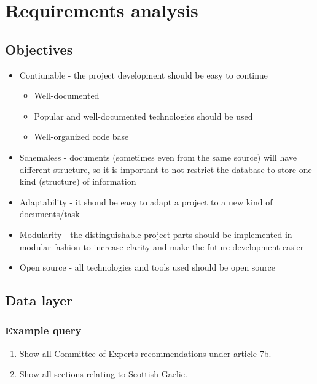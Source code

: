 \documentclass[11pt, a4paper]{report}
\begin{document}









\chapter{Requirements analysis}

\section{Objectives}
\begin{itemize}
  \item Contiunable - the project development should be easy to continue
    \begin{itemize}
      \item Well-documented
      \item Popular and well-documented technologies should be used
      \item Well-organized code base
    \end{itemize}
  \item Schemaless - documents (sometimes even from the same source) will have different structure, so it is important to not restrict the database to store one kind (structure) of information
  \item Adaptability - it shoud be easy to adapt a project to a new kind of documents/task
  \item Modularity - the distinguishable project parts should be implemented in modular fashion to increase clarity and make the future development easier
  \item Open source - all technologies and tools used should be open source
\end{itemize}

\section{Data layer}
\subsection{Example query}
\begin{enumerate}
  \item Show all Committee of Experts recommendations under article 7b.
  \item Show all sections relating to Scottish Gaelic.
\end{enumerate}
\end{document}
